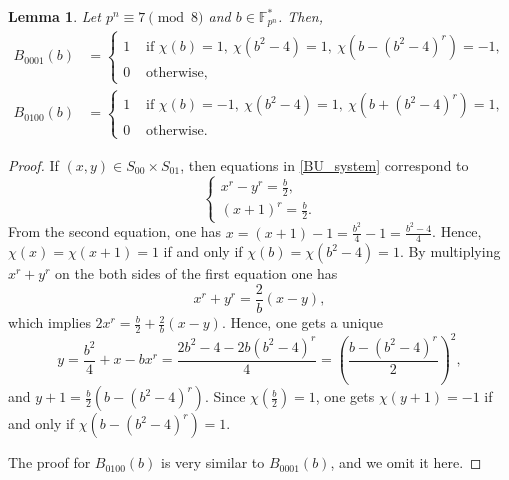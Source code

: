 \documentclass[11pt]{article}
\numberwithin{theorem}{section}
\newtheorem{lemma}[theorem]{Lemma}
\newcommand{\Fpnmul}{\mathbb{F}_{p^n}^*}
\begin{document}
\begin{lemma}\label{BU_lemma S01}
	Let $p^n\equiv 7\pmod{8}$ and $b\in \Fpnmul$. Then,
	\begin{align*}
		B_{0001}(b)&=
		\begin{cases}
			1 &\text{ if } \chi(b)=1,\ \chi(b^2-4)=1,\ \chi(b-(b^2-4)^r)=-1,\\
			0 &\text{ otherwise, } 
		\end{cases}\\
		B_{0100}(b)&=
		\begin{cases}
			1 &\text{ if } \chi(b)=-1,\ \chi(b^2-4)=1,\ \chi(b+(b^2-4)^r)=1,\\
			0 &\text{ otherwise. } 
		\end{cases}
	\end{align*}
\end{lemma}
\begin{proof}
If $(x,y)\in S_{00}\times S_{01}$, then equations in \eqref{BU_system} correspond to 
\begin{equation*}
	\begin{cases}
		x^r-y^r = \frac{b}{2},\\
		(x+1)^r = \frac{b}{2}.
	\end{cases}
\end{equation*} 
From the second equation, one has $x = (x+1)-1 = \frac{b^2}{4}-1 = \frac{b^2-4}{4}$. Hence, $\chi(x)=\chi(x+1)=1$ if and only if $\chi(b) = \chi(b^2-4) = 1$. By multiplying $x^r + y^r$ on the both sides of the first equation one has
\begin{equation*}
	x^r + y^r = \frac{2}{b}(x-y),
\end{equation*}
which implies $2x^r = \frac{b}{2} + \frac{2}{b}(x-y)$. Hence, one gets a unique 
\begin{equation*}
	y = \frac{b^2}{4} + x - bx^r = \frac{2b^2-4 -2b(b^2-4)^r}{4} = \left( \frac{b-(b^2-4)^r}{2}\right)^2,
\end{equation*}
and $y+1 = \frac{b}{2}(b-(b^2-4)^r)$. Since $\chi\left( \frac{b}{2} \right)=1$, one gets $\chi(y+1)=-1$ if and only if $\chi(b-(b^2-4)^r)=1$.

The proof for $B_{0100}(b)$ is very similar to $B_{0001}(b)$, and we omit it here.
\end{proof}
\end{document}
